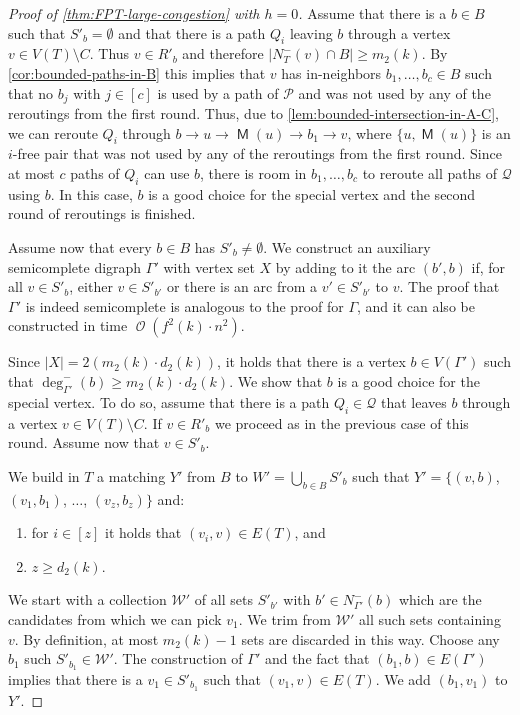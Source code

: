 \documentclass[a4paper,UKenglish,cleveref, autoref, thm-restate]{lipics-v2021}
\DeclareMathOperator{\Ocal}{\mathcal{O}\xspace}
\DeclareMathOperator{\Mat}{\mathsf M}
\begin{document}
\begin{proof}[Proof of \autoref{thm:FPT-large-congestion} with $h = 0$]
Assume that there is a $b \in B$ such that $S'_b = \emptyset$ and that there is a path $Q_i$ leaving $b$ through a vertex $v \in V(T) \setminus C$.
Thus $v \in R'_b$ and therefore $|N^-_T(v) \cap B| \geq m_2(k)$.
By \autoref{cor:bounded-paths-in-B} this implies that $v$ has in-neighbors $b_1, \ldots, b_c \in B$ such that no $b_j$ with $j \in [c]$ is used by a path of $\mathcal{P}$ and was not used by any of the reroutings from the first round.
Thus, due to \autoref{lem:bounded-intersection-in-A-C}, we can reroute $Q_i$ through $b \to u \to \Mat(u) \to b_1 \to v$, where $\{u, \Mat(u)\}$ is an $i$-free pair that was not used by any of the reroutings from the first round.
Since at most $c$ paths of $Q_i$ can use $b$, there is room in $b_1, \ldots, b_c$ to reroute all paths of $\mathcal{Q}$ using $b$.
In this case, $b$ is a good choice for the special vertex and the second round of reroutings is finished.

Assume now that every $b \in B$ has $S'_b \neq \emptyset$.
We construct an auxiliary semicomplete digraph $\Gamma'$ with vertex set $X$ by adding to it the arc $(b', b)$ if, for all $v \in S'_b$, either $v \in S'_{b'}$ or there is an arc from a $v' \in S'_{b'}$ to $v$.
The proof that $\Gamma'$ is indeed semicomplete is analogous to the proof for $\Gamma$, and it can also be constructed in time $\Ocal(f^2(k) \cdot n^2)$.

Since $|X| = 2(m_2(k)\cdot d_2(k))$, it holds that there is a vertex $b \in V(\Gamma')$ such that $\deg^-_{\Gamma'}(b) \geq m_2(k)\cdot d_2(k)$.
We show that $b$ is a good choice for the special vertex.
To do so, assume that there is a path $Q_i \in \mathcal{Q}$ that leaves $b$ through a vertex $v \in V(T) \setminus C$.
If $v \in R'_{b}$ we proceed as in the previous case of this round.
Assume now that $v \in S'_{b}$.

We build in $T$ a matching $Y'$ from $B$ to $W' = \bigcup_{b \in B}S'_b$ such that $Y' = \{(v, b)$, $(v_1, b_1)$, $\ldots$, $(v_z, b_z)\}$ and:
\begin{enumerate}
  \item for $i \in [z]$ it holds that $(v_i, v) \in E(T)$, and 
  \item $z \geq d_2(k)$.
\end{enumerate}

We start with a collection $\mathcal{W'}$ of all sets $S'_{b'}$ with $b' \in N^-_{\Gamma'}(b)$ which are the candidates from which we can pick $v_1$.
We trim from $\mathcal{W'}$ all such sets containing $v$.
By definition, at most $m_2(k)-1$ sets are discarded in this way.
Choose any $b_1$ such $S'_{b_1} \in \mathcal{W'}$.
The construction of $\Gamma'$ and the fact that $(b_1, b) \in E(\Gamma')$ implies that there is a $v_1 \in S'_{b_1}$ such that $(v_1, v) \in E(T)$.
We add $(b_1, v_1)$ to $Y'$.


\end{proof}
\end{document}
